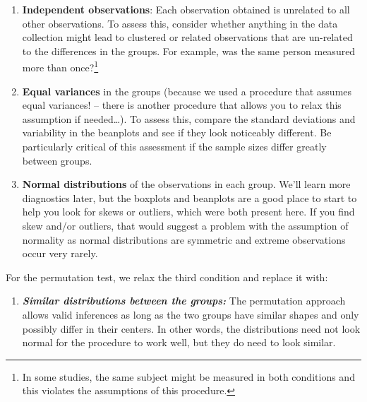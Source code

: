 \documentclass[]{book}
\providecommand{\tightlist}{%
  \setlength{\itemsep}{0pt}\setlength{\parskip}{0pt}}
\let\rmarkdownfootnote\footnote%
\def\footnote{\protect\rmarkdownfootnote}
\theoremstyle{definition}
\theoremstyle{definition}
\theoremstyle{remark}
\begin{document}
\begin{enumerate}
\def\labelenumi{\arabic{enumi}.}
\item
  \textbf{Independent observations}: Each observation obtained is
  unrelated to all other observations. To assess this, consider whether
  anything in the data collection might lead to clustered or related
  observations that are un-related to the differences in the groups. For
  example, was the same person measured more than once?\footnote{In some
    studies, the same subject might be measured in both conditions and
    this violates the assumptions of this procedure.}
\item
  \textbf{Equal variances} in the groups (because we used a procedure
  that assumes equal variances! -- there is another procedure that
  allows you to relax this assumption if needed\ldots{}). To assess
  this, compare the standard deviations and variability in the beanplots
  and see if they look noticeably different. Be particularly critical of
  this assessment if the sample sizes differ greatly between groups.
\item
  \textbf{Normal distributions} of the observations in each group. We'll
  learn more diagnostics later, but the boxplots and beanplots are a
  good place to start to help you look for skews or outliers, which were
  both present here. If you find skew and/or outliers, that would
  suggest a problem with the assumption of normality as normal
  distributions are symmetric and extreme observations occur very
  rarely.
\end{enumerate}

For the permutation test, we relax the third condition and replace it
with:

\begin{enumerate}
\def\labelenumi{\arabic{enumi}.}
\setcounter{enumi}{2}
\tightlist
\item
  \textbf{\emph{Similar distributions between the groups:}} The
  permutation approach allows valid inferences as long as the two groups
  have similar shapes and only possibly differ in their centers. In
  other words, the distributions need not look normal for the procedure
  to work well, but they do need to look similar.
\end{enumerate}
\end{document}
